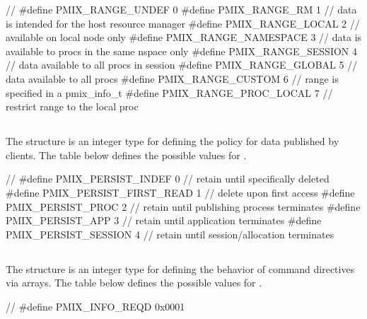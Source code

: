 \cspecificstart
\begin{codepar}
//
#define PMIX_RANGE_UNDEF        0
#define PMIX_RANGE_RM           1   // data is intended for the host resource manager
#define PMIX_RANGE_LOCAL        2   // available on local node only
#define PMIX_RANGE_NAMESPACE    3   // data is available to procs in the same nspace only
#define PMIX_RANGE_SESSION      4   // data available to all procs in session
#define PMIX_RANGE_GLOBAL       5   // data available to all procs
#define PMIX_RANGE_CUSTOM       6   // range is specified in a pmix_info_t
#define PMIX_RANGE_PROC_LOCAL   7   // restrict range to the local proc
\end{codepar}
\cspecificend

\subsection{}

The  structure is an integer type for defining the policy for data published by clients.
The table below defines the possible values for .

\cspecificstart
\begin{codepar}
//
#define PMIX_PERSIST_INDEF          0   // retain until specifically deleted
#define PMIX_PERSIST_FIRST_READ     1   // delete upon first access
#define PMIX_PERSIST_PROC           2   // retain until publishing process terminates
#define PMIX_PERSIST_APP            3   // retain until application terminates
#define PMIX_PERSIST_SESSION        4   // retain until session/allocation terminates
\end{codepar}
\cspecificend


\subsection{}

The  structure is an integer type for defining the behavior of command directives via  arrays.
The table below defines the possible values for .

\cspecificstart
\begin{codepar}
//
#define PMIX_INFO_REQD          0x0001
\end{codepar}
\cspecificend



